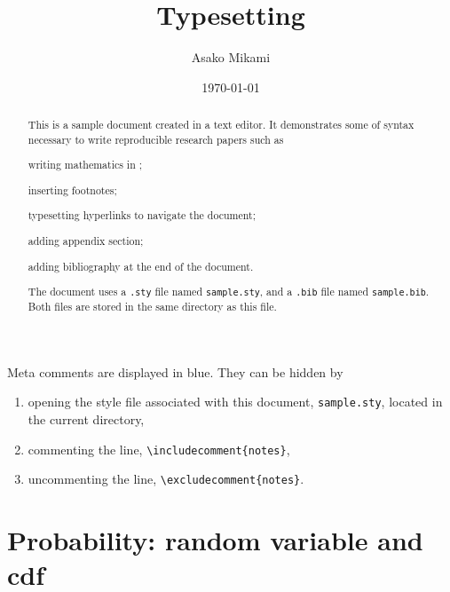 \documentclass[12pt, notitlepage]{article}
\begin{document}
\title{\latex Typesetting}
\author{Asako Mikami}
\date{\today}
\maketitle

\begin{abstract}
This is a sample document created in a \latex text editor. It demonstrates some of \latex syntax necessary to write reproducible research papers such as 
\begin{enumerate*}[label =\alph*)]
\item writing mathematics in \latex; 
\item inserting footnotes; 
\item typesetting hyperlinks to navigate the document; 
\item adding appendix section; 
\item adding bibliography at the end of the document. 
\end{enumerate*}
The document uses a \texttt{.sty} file named \texttt{sample.sty}, and a \texttt{.bib} file named \texttt{sample.bib}. Both files are stored in the same directory as this file. 
\end{abstract}


\begin{notes}
Meta comments are displayed in blue. They can be hidden by 
\begin{enumerate}[label=\arabic*.)]
\item opening the style file associated with this document, \texttt{sample.sty}, located in the current directory,
\item commenting the line, \verb|\includecomment{notes}|, 
\item uncommenting the line, \verb|\excludecomment{notes}|.
\end{enumerate}
\end{notes}



\section{Probability: random variable and cdf}
\end{document}
